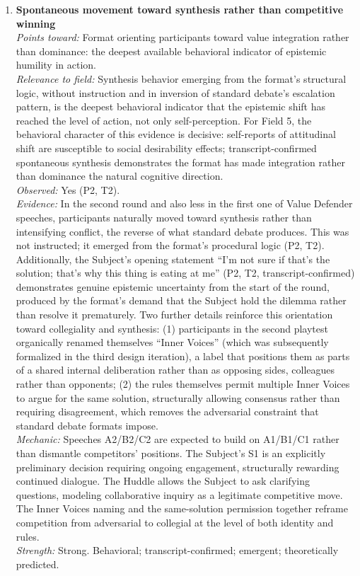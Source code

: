 \documentclass[12pt]{article}
\begin{document}
\begin{enumerate}
\item \textbf{Spontaneous movement toward synthesis rather than competitive winning}\\
\textit{Points toward:} Format orienting participants toward value integration rather than dominance: the deepest available behavioral indicator of epistemic humility in action.\\
\textit{Relevance to field:} Synthesis behavior emerging from the format's structural logic, without instruction and in inversion of standard debate's escalation pattern, is the deepest behavioral indicator that the epistemic shift has reached the level of action, not only self-perception. For Field 5, the behavioral character of this evidence is decisive: self-reports of attitudinal shift are susceptible to social desirability effects; transcript-confirmed spontaneous synthesis demonstrates the format has made integration rather than dominance the natural cognitive direction.\\
\textit{Observed:} Yes (P2, T2).\\
\textit{Evidence:} In the second round and also less in the first one of Value Defender speeches, participants naturally moved toward synthesis rather than intensifying conflict, the reverse of what standard debate produces. This was not instructed; it emerged from the format's procedural logic (P2, T2). Additionally, the Subject's opening statement ``I'm not sure if that's the solution; that's why this thing is eating at me'' (P2, T2, transcript-confirmed) demonstrates genuine epistemic uncertainty from the start of the round, produced by the format's demand that the Subject hold the dilemma rather than resolve it prematurely. Two further details reinforce this orientation toward collegiality and synthesis: (1) participants in the second playtest organically renamed themselves ``Inner Voices'' (which was subsequently formalized in the third design iteration), a label that positions them as parts of a shared internal deliberation rather than as opposing sides, colleagues rather than opponents; (2) the rules themselves permit multiple Inner Voices to argue for the same solution, structurally allowing consensus rather than requiring disagreement, which removes the adversarial constraint that standard debate formats impose.\\
\textit{Mechanic:} Speeches A2/B2/C2 are expected to build on A1/B1/C1 rather than dismantle competitors' positions. The Subject's S1 is an explicitly preliminary decision requiring ongoing engagement, structurally rewarding continued dialogue. The Huddle allows the Subject to ask clarifying questions, modeling collaborative inquiry as a legitimate competitive move. The Inner Voices naming and the same-solution permission together reframe competition from adversarial to collegial at the level of both identity and rules.\\
\textit{Strength:} Strong. Behavioral; transcript-confirmed; emergent; theoretically predicted.

\end{enumerate}
\end{document}
